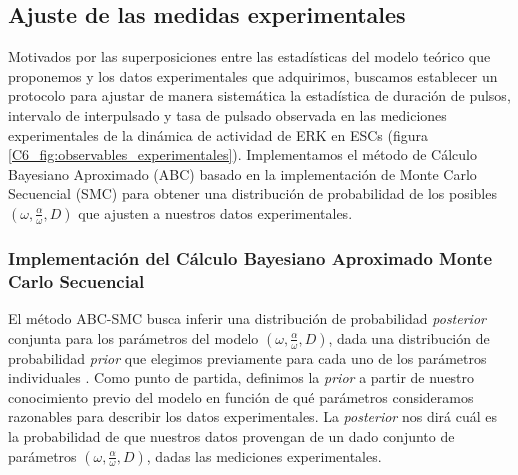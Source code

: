 \documentclass[./main.tex]{subfiles}
\begin{document}
\begin{figure}
    \label{C6_fig:2d_plots_sup}
\end{figure}





\subsection{Ajuste de las medidas experimentales}

Motivados por las superposiciones entre las estadísticas del modelo teórico que proponemos y los datos experimentales que adquirimos, buscamos establecer un protocolo para ajustar de manera sistemática la estadística de duración de pulsos, intervalo de interpulsado y tasa de pulsado observada en las mediciones experimentales de la dinámica de actividad de ERK en ESCs (figura \ref{C6_fig:observables_experimentales}). Implementamos el método de Cálculo Bayesiano Aproximado (ABC) basado en la implementación de Monte Carlo Secuencial (SMC) para obtener una distribución de probabilidad de los posibles $(\omega,\frac{\alpha}{\omega},D)$ que ajusten a nuestros datos experimentales.


\subsubsection{Implementación del Cálculo Bayesiano Aproximado Monte Carlo Secuencial}
\label{C6_sssec:implementac_ABCSMC}


El método ABC-SMC busca inferir una distribución de probabilidad \textit{posterior} conjunta para los parámetros del modelo $(\omega,\frac{\alpha}{\omega},D)$, dada una distribución de probabilidad \textit{prior} que elegimos previamente para cada uno de los parámetros individuales \cite{Toni2009}. Como punto de partida, definimos la \textit{prior} a partir de nuestro conocimiento previo del modelo en función de qué parámetros consideramos razonables para describir los datos experimentales. La \textit{posterior} nos dirá cuál es la probabilidad de que nuestros datos provengan de un dado conjunto de parámetros $(\omega,\frac{\alpha}{\omega},D)$, dadas las mediciones experimentales.
\end{document}
